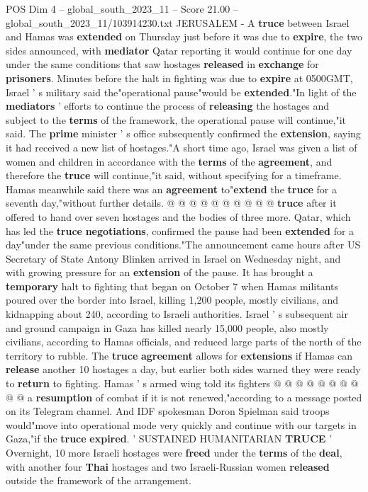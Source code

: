 \begin{textsample}{POS Dim 4 – global\_south\_2023\_11 – Score 21.00 – global\_south\_2023\_11/103914230.txt}  \label{ex:f4_pos_163}
JERUSALEM - A \textbf{truce} between Israel and Hamas was \textbf{extended} on Thursday just before it was due to \textbf{expire}, the two sides announced, with \textbf{mediator} Qatar reporting it would continue for one day under the same conditions that saw hostages \textbf{released} in \textbf{exchange} for \textbf{prisoners}.
Minutes before the halt in fighting was due to \textbf{expire} at 0500GMT, Israel ' s military said the"operational pause"would be \textbf{extended}."In light of the \textbf{mediators} ' efforts to continue the process of \textbf{releasing} the hostages and subject to the \textbf{terms} of the framework, the operational pause will continue,"it said.
The \textbf{prime} minister ' s office subsequently confirmed the \textbf{extension}, saying it had received a new list of hostages."A short time ago, Israel was given a list of women and children in accordance with the \textbf{terms} of the \textbf{agreement}, and therefore the \textbf{truce} will continue,"it said, without specifying for a timeframe.
Hamas meanwhile said there was an \textbf{agreement} to"\textbf{extend} the \textbf{truce} for a seventh day,"without further details. @ @ @ @ @ @ @ @ @ @ \textbf{truce} after it offered to hand over seven hostages and the bodies of three more.
Qatar, which has led the \textbf{truce} \textbf{negotiations}, confirmed the pause had been \textbf{extended} for a day"under the same previous conditions."The announcement came hours after US Secretary of State Antony Blinken arrived in Israel on Wednesday night, and with growing pressure for an \textbf{extension} of the pause.
It has brought a \textbf{temporary} halt to fighting that began on October 7 when Hamas militants poured over the border into Israel, killing 1,200 people, mostly civilians, and kidnapping about 240, according to Israeli authorities.
Israel ' s subsequent air and ground campaign in Gaza has killed nearly 15,000 people, also mostly civilians, according to Hamas officials, and reduced large parts of the north of the territory to rubble.
The \textbf{truce} \textbf{agreement} allows for \textbf{extensions} if Hamas can \textbf{release} another 10 hostages a day, but earlier both sides warned they were ready to \textbf{return} to fighting.
Hamas ' s armed wing told its fighters @ @ @ @ @ @ @ @ @ @ a \textbf{resumption} of combat if it is not renewed,"according to a message posted on its Telegram channel.
And IDF spokesman Doron Spielman said troops would"move into operational mode very quickly and continue with our targets in Gaza,"if the \textbf{truce} \textbf{expired}. ' SUSTAINED HUMANITARIAN \textbf{TRUCE} ' Overnight, 10 more Israeli hostages were \textbf{freed} under the \textbf{terms} of the \textbf{deal}, with another four \textbf{Thai} hostages and two Israeli-Russian women \textbf{released} outside the framework of the arrangement.

\end{textsample}
